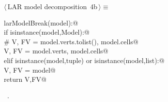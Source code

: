 \documentclass[11pt,oneside]{article}	%
\begin{document}
\begin{flushleft} \small
\begin{minipage}{\linewidth} \label{scrap9}
\protect{}$\langle\,$LAR model decomposition\nobreak\ {\footnotesize 4b}$\,\rangle\equiv$
\vspace{-1ex}
\begin{list}{}{} \item
\mbox{}\verb@def larModelBreak(model):@\\
\mbox{}\verb@    if isinstance(model,Model):@\\
\mbox{}\verb@        # V, FV = model.verts.tolist(), model.cells@\\
\mbox{}\verb@        V, FV = model.verts, model.cells@\\
\mbox{}\verb@    elif isinstance(model,tuple) or isinstance(model,list):@\\
\mbox{}\verb@        V, FV = model@\\
\mbox{}\verb@    return V,FV@\\
\mbox{}\verb@@{\NWsep}
\end{list}
\vspace{-1ex}
\footnotesize\addtolength{\baselineskip}{-1ex}
\begin{list}{}{\setlength{\itemsep}{-\parsep}\setlength{\itemindent}{-\leftmargin}}
\item \NWtxtMacroRefIn\ .
\end{list}
\end{minipage}\\[4ex]
\end{flushleft}
\end{document}
